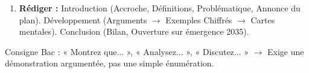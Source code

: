 \documentclass[11pt]{article}
\newcommand{\cle}[1]{{\popxbold\color{popdark}#1}}
\begin{document}
\begin{methode}
\begin{enumerate}
\begin{itemize}
\begin{itemize}
            \item B. Politiques sectorielles adaptées par zone (PDR, PNDP, Plan d'urgence 3 ans, Grande muraille verte, Zonage forestier, SEMRY II).
        \end{itemize}
    \end{itemize}
    \item \textbf{Rédiger :} Introduction (Accroche, Définitions, Problématique, Annonce du plan). Développement (Arguments $\rightarrow$ Exemples Chiffrés $\rightarrow$ Cartes mentales). Conclusion (Bilan, Ouverture sur émergence 2035).
\end{enumerate}
\cle{Consigne Bac} : « Montrez que... », « Analysez... », « Discutez... » $\rightarrow$ Exige une démonstration argumentée, pas une simple énumération.
\end{methode}
\end{document}
